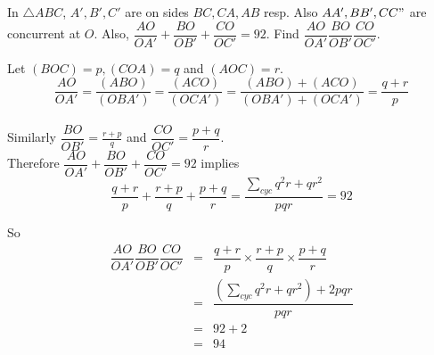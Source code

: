 \documentclass{subfile}
\begin{document}
		\begin{problem}
			In $\triangle ABC$, $A',B',C'$ are on sides $BC,CA,AB$ resp. Also $AA',BB',CC"$ are concurrent at $O$. Also, $\dfrac{AO}{OA'}+\dfrac{BO}{OB'}+\dfrac{CO}{OC'}=92$. Find $\dfrac{AO}{OA'}\dfrac{BO}{OB'}\dfrac{CO}{OC'}$.
		\end{problem}

		\begin{solution} Let $(BOC)=p,(COA)=q$ and $(AOC)=r$.
			$$\dfrac{AO}{OA'}=\dfrac{(ABO)}{(OBA')}=\dfrac{(ACO)}{(OCA')}=\dfrac{(ABO)+(ACO)}{(OBA')+(OCA')}=\dfrac{q+r}{p}$$\\
			Similarly $\dfrac{BO}{OB'}=\frac{r+p}{q}$  and  $\dfrac{CO}{OC'}=\dfrac{p+q}{r}$.\\
			Therefore $\dfrac{AO}{OA'}+\dfrac{BO}{OB'}+\dfrac{CO}{OC'}=92$ implies\\ $$\dfrac{q+r}{p}+\dfrac{r+p}{q}+\dfrac{p+q}{r}=\frac{\sum_{cyc}^{}{q^2r+qr^2}}{pqr}=92$$


		So \begin{eqnarray*}
			\dfrac{AO}{OA'}\dfrac{BO}{OB'}\dfrac{CO}{OC'}
			& = & \dfrac{q+r}{p}\times \dfrac{r+p}{q}\times \dfrac{p+q}{r}\\
			& = & \dfrac{(\sum_{cyc}^{}{q^2r+qr^2})+2pqr}{pqr}\\
			& = & 92+2\\
			& = & 94
		\end{eqnarray*}

		\end{solution}

		
\end{document}
